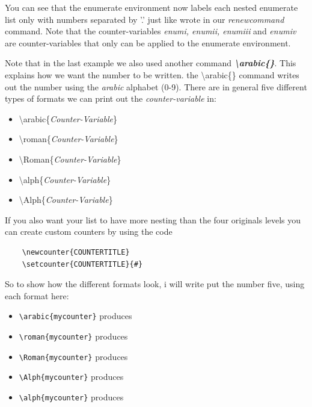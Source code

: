 \documentclass{article}
\newcommand{\jbs}[1]{\textbackslash{}#1} %
\begin{document}
You can see that the enumerate environment now labels each nested enumerate list only with numbers separated by '.' just like wrote in our \textit{renewcommand} command.
Note that the counter-variables \textit{enumi, enumii, enumiii} and \textit{enumiv} are counter-variables that only can be applied to the enumerate environment.

Note that in the last example we also used another command \textbf{\textit{\jbs{arabic\{\}}}}. This explains how we want the number to be written.
the \jbs{arabic\{\}} command writes out the number using the \textit{arabic} alphabet (0-9). There are in general five different types of formats we can print out the \textit{counter-variable}
in:
\begin{itemize}
    \item \jbs{arabic\{\textit{Counter-Variable}\}}
    \item \jbs{roman\{\textit{Counter-Variable}\}}
    \item \jbs{Roman\{\textit{Counter-Variable}\}}
    \item \jbs{alph\{\textit{Counter-Variable}\}}
    \item \jbs{Alph\{\textit{Counter-Variable}\}}
\end{itemize}

If you also want your list to have more nesting than the four originals levels you can create custom counters by using the code
\begin{center}
    \begin{verbatim}
    \newcounter{COUNTERTITLE}    
    \setcounter{COUNTERTITLE}{#}
    \end{verbatim}
\end{center}

So to show how the different formats look, i will write put the number five, using each format here:

\setcounter{mycounter}{5}
\begin{itemize}
    \item \verb|\arabic{mycounter}| produces 
    \item \verb|\roman{mycounter}| produces  
    \item \verb|\Roman{mycounter}| produces 
    \item \verb|\Alph{mycounter}| produces 
    \item \verb|\alph{mycounter}| produces 
\end{itemize}
\end{document}
